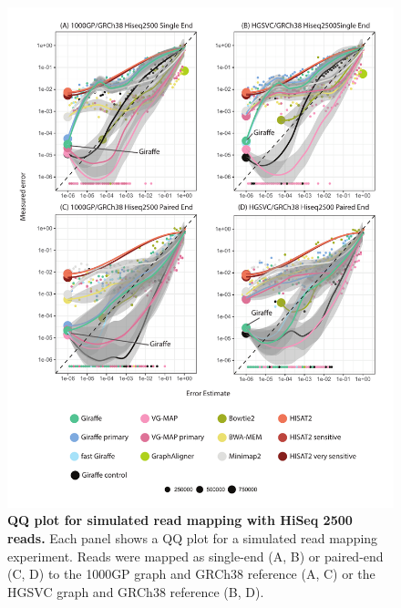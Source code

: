\documentclass[11pt]{ucscthesis}
\begin{document}
\begin{figure}[H]
    \centering
    \includegraphics[width=.8\linewidth]{aim2_supplement_hiseq2500-qq.pdf}
    \caption[QQ plot for simulated read mapping with HiSeq 2500 reads]{\textbf{QQ plot for simulated read mapping with HiSeq 2500 reads.} Each panel shows a QQ plot for a simulated read mapping experiment. Reads were mapped as single-end (A, B) or paired-end (C, D) to the 1000GP graph and GRCh38 reference (A, C) or the HGSVC graph and GRCh38 reference (B, D).}
    \label{fig:aim2_supplement_hiseq2500_qq}
\end{figure}
\end{document}
